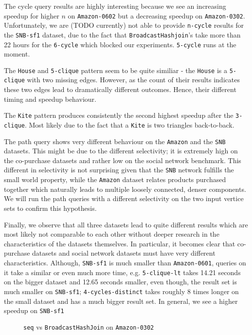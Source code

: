 The cycle query results are highly interesting because we see an increasing speedup for higher $n$ on \texttt{Amazon-0602} but a
decreasing speedup on \texttt{Amazon-0302}.
Unfortunately, we are (TODO currently) not able to provide \texttt{n-cycle} results for the \texttt{SNB-sf1} dataset, due to the fact that
\texttt{BroadcastHashjoin}'s take more than 22 hours for the \texttt{6-cycle} which blocked our experiments.
\texttt{5-cycle} runs at the moment.

The \texttt{House} and \texttt{5-clique} pattern seem to be quite similiar - the \texttt{House} is a \texttt{5-clique} with two missing
edges.
However, as the count of their results indicates these two edges lead to dramatically different outcomes.
Hence, their different timing and speedup behaviour.

The \texttt{Kite} pattern produces consistently the second highest speedup after the \texttt{3-clique}.
Most likely due to the fact that a \texttt{Kite} is two triangles back-to-back.

The path query shows very different behaviour on the \texttt{Amazon} and the \texttt{SNB} datasets.
This might be due to the different selectivity; it is extremely high on the co-purchase datasets and rather low on the social network
benchmark.
This different in selectivity is not surprising given that the \texttt{SNB} network fulfills the small world property, while the
\texttt{Amazon} dataset relates products purchased together which naturally leads to multiple loosely connected, denser components.
We will run the path queries with a different selectivity on the two input vertice sets to confirm this hypothesis.

Finally, we observe that all three datasets lead to quite different results which are most likely not comparable to each other without deeper research
in the characteristics of the datasets themselves.
In particular, it becomes clear that co-purchase datasets and social network datasets must have very different characteristics.
Although, \texttt{SNB-sf1} is much smaller than \texttt{Amazon-0601}, queries on it take a similar or even much more time,
e.g. \texttt{5-clique-lt} takes 14.21 seconds on the bigger dataset and 12.65 seconds smaller, even though, the result set is much
smaller on \texttt{SNB-sf1};
\texttt{4-cycles-distinct} takes roughly 8 times longer on the small dataset and has a much bigger result set.
In general, we see a higher speedup on \texttt{SNB-sf1}
\begin{figure}
    \centering
    
    \caption{\texttt{seq} vs \texttt{BroadcastHashJoin} on \texttt{Amazon-0302}}
    \label{fig:seq-bar-ama-0302}
\end{figure}

